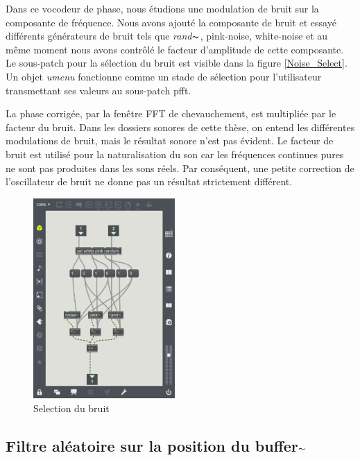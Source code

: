    Dans ce vocodeur de phase, nous étudions une modulation de bruit sur la composante de fréquence. Nous avons ajouté la composante de bruit et essayé différents générateurs de bruit tels que \textit{rand$\thicksim $}, pink-noise, white-noise et au même moment nous avons contrôlé le facteur d'amplitude de cette composante. Le sous-patch pour la sélection du bruit est visible dans la figure \ref{Noise_Select}. Un objet \textit{umenu} fonctionne comme un stade de sélection pour l'utilisateur transmettant ses valeurs au sous-patch pfft.

    La phase corrigée, par la fenêtre FFT de chevauchement, est multipliée par le facteur du bruit. Dans les dossiers sonores de cette thèse, on entend les différentes modulations de bruit, mais le résultat sonore n’est pas évident. Le facteur de bruit est utilisé pour la naturalisation du son car les fréquences continues pures ne sont pas produites dans les sons réels. Par conséquent, une petite correction de l'oscillateur de bruit ne donne pas un résultat strictement différent.

\begin{figure}
  \vspace{-20pt}
  \begin{center}
    \includegraphics[width=0.48\textwidth]{Graphs/Noise_Select.png}
  \end{center}
  \vspace{-20pt}
  \caption{Selection du bruit}
  \vspace{-10pt}
\end{figure}

\subsection{Filtre aléatoire sur la position du buffer$\thicksim$}

